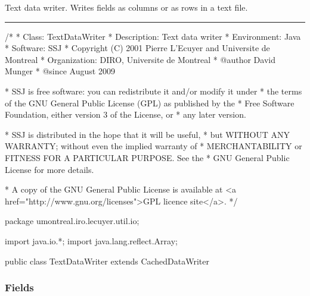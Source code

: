 
Text data writer. Writes fields as columns or as rows in a text file.

\bigskip\hrule

\begin{code}
\begin{hide}
/*
 * Class:        TextDataWriter
 * Description:  Text data writer
 * Environment:  Java
 * Software:     SSJ 
 * Copyright (C) 2001  Pierre L'Ecuyer and Universite de Montreal
 * Organization: DIRO, Universite de Montreal
 * @author       David Munger 
 * @since        August 2009

 * SSJ is free software: you can redistribute it and/or modify it under
 * the terms of the GNU General Public License (GPL) as published by the
 * Free Software Foundation, either version 3 of the License, or
 * any later version.

 * SSJ is distributed in the hope that it will be useful,
 * but WITHOUT ANY WARRANTY; without even the implied warranty of
 * MERCHANTABILITY or FITNESS FOR A PARTICULAR PURPOSE.  See the
 * GNU General Public License for more details.

 * A copy of the GNU General Public License is available at
   <a href="http://www.gnu.org/licenses">GPL licence site</a>.
 */
\end{hide}
package umontreal.iro.lecuyer.util.io;
\begin{hide}
import java.io.*;
import java.lang.reflect.Array;
\end{hide}

public class TextDataWriter extends CachedDataWriter \begin{hide} {
\end{hide}
\end{code}


\subsubsection*{Fields}

